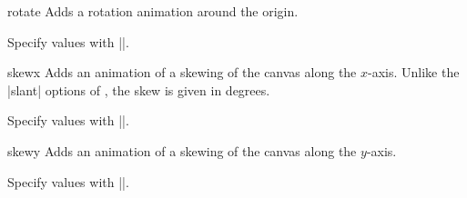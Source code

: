 \begin{sysanimateattribute}{rotate}
    Adds a rotation animation around the origin.

    Specify values with |\pgfsysanimvalscalar|.
\begin{codeexample}[imagesource={standalone/pgfmanual-en-pgfsys-animations-animation-21.svg}]
\end{codeexample}
\end{sysanimateattribute}

\begin{sysanimateattribute}{skewx}
    Adds an animation of a skewing of the canvas along the $x$-axis. Unlike the
    |slant| options of \tikzname, the skew is given in degrees.

    Specify values with |\pgfsysanimvalscalar|.
\begin{codeexample}[imagesource={standalone/pgfmanual-en-pgfsys-animations-animation-22.svg}]
\end{codeexample}
\end{sysanimateattribute}

\begin{sysanimateattribute}{skewy}
    Adds an animation of a skewing of the canvas along the $y$-axis.

    Specify values with |\pgfsysanimvalscalar|.
\end{sysanimateattribute}


